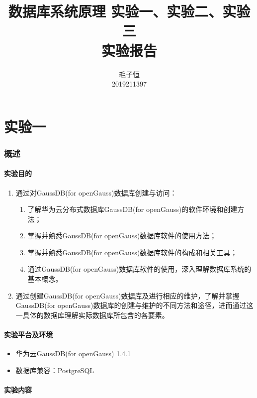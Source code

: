 \documentclass[lang=cn,11pt,a4paper,cite=authornum]{paper}
\title{数据库系统原理 实验一、实验二、实验三 \\ 实验报告}
\author{毛子恒 \\ 2019211397}
\institute{北京邮电大学\ 计算机学院}
\date{\zhtoday}
\begin{document}
\maketitle

\part{实验一}

\section{概述}

\subsection{实验目的}

\begin{enumerate}
    \item 通过对GaussDB(for openGauss)数据库创建与访问：
          \begin{enumerate}
              \item 了解华为云分布式数据库GaussDB(for openGauss)的软件环境和创建方法；
              \item 掌握并熟悉GaussDB(for openGauss)数据库软件的使用方法；
              \item 掌握并熟悉GaussDB(for openGauss)数据库软件的构成和相关工具；
              \item 通过GaussDB(for openGauss)数据库软件的使用，深入理解数据库系统的基本概念。
          \end{enumerate}
    \item 通过创建GaussDB(for openGauss)数据库及进行相应的维护，了解并掌握GaussDB(for openGauss)数据库的创建与维护的不同方法和途径，进而通过这一具体的数据库理解实际数据库所包含的各要素。
\end{enumerate}

\subsection{实验平台及环境}

\begin{itemize}
    \item 华为云GaussDB(for openGauss) 1.4.1
    \item 数据库兼容：PostgreSQL
\end{itemize}

\subsection{实验内容}
\end{document}
